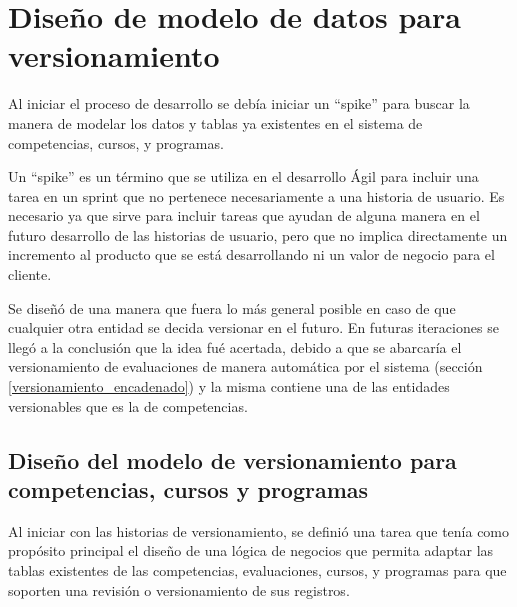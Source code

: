 \section{Diseño de modelo de datos para versionamiento}
Al iniciar el proceso de desarrollo se debía iniciar un \enquote{spike} para buscar la manera de modelar los datos y tablas ya existentes en el sistema de competencias, cursos, y programas. 

Un \enquote{spike} es un término que se utiliza en el desarrollo Ágil para incluir una tarea en un sprint que no pertenece necesariamente a una historia de usuario. Es necesario ya que sirve para incluir tareas que ayudan de alguna manera en el futuro desarrollo de las historias de usuario, pero que no implica directamente un incremento al producto que se está desarrollando ni un valor de negocio para el cliente\citep{leffingwell2010agile}.

Se diseñó de una manera que fuera lo más general posible en caso de que cualquier otra entidad se decida versionar en el futuro. En futuras iteraciones se llegó a la conclusión que la idea fué acertada, debido a que se abarcaría el versionamiento de evaluaciones de manera automática por el sistema (sección \ref{versionamiento_encadenado}) y la misma contiene una de las entidades versionables que es la de competencias.

\begin{table}[H]
\centering
\caption{Historias de usuario para el diseño de modelo de datos para versionamiento}
\label{epic:1}
\end{table}


\subsection{Diseño del modelo de versionamiento para competencias, cursos y programas}
Al iniciar con las historias de versionamiento, se definió una tarea que tenía como propósito principal el diseño de una lógica de negocios que permita adaptar las tablas existentes de las competencias, evaluaciones, cursos, y programas para que soporten una revisión o versionamiento de sus registros.


